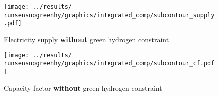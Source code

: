\begin{figure}[h]
    \centering
    \texttt{[image: ../results/\\runsensnogreenhy/graphics/integrated\_comp/subcontour\_supply.pdf]}
    \caption{Electricity supply {\bf without} green hydrogen constraint}
    \label{fig:supply}
\end{figure}

\begin{figure}[h]
    \centering
    \texttt{[image: ../results/\\runsensnogreenhy/graphics/integrated\_comp/subcontour\_cf.pdf]}
    \caption{Capacity factor {\bf without} green hydrogen constraint}
    \label{fig:cf-noghc}
\end{figure}

\clearpage